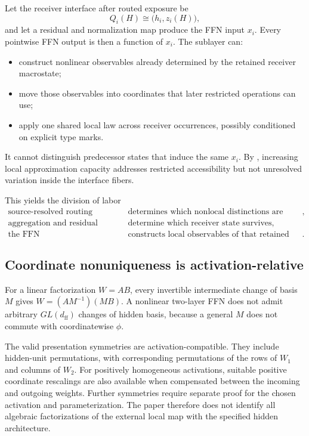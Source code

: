 Let the receiver interface after routed exposure be
\[
Q_i(H)\cong\bigl(h_i,z_i(H)\bigr),
\]
and let a residual and normalization map produce the FFN input $x_i$. Every pointwise FFN output is then a function of $x_i$. The sublayer can:
\begin{itemize}
\item construct nonlinear observables already determined by the retained receiver macrostate;
\item move those observables into coordinates that later restricted operations can use;
\item apply one shared local law across receiver occurrences, possibly conditioned on explicit type marks.
\end{itemize}
It cannot distinguish predecessor states that induce the same $x_i$. By , increasing local approximation capacity addresses restricted accessibility but not unresolved variation inside the interface fibers.

This yields the division of labor
\[
\boxed{
\begin{aligned}
\text{source-resolved routing}
&\text{ determines which nonlocal distinctions are constructed},\\
\text{aggregation and residual retention}
&\text{ determine which receiver state survives},\\
\text{the FFN}
&\text{ constructs local observables of that retained state}.
\end{aligned}}
\]

\subsection{Coordinate nonuniqueness is activation-relative}

For a linear factorization $W=AB$, every invertible intermediate change of basis $M$ gives $W=(AM^{-1})(MB)$. A nonlinear two-layer FFN does not admit arbitrary $GL(d_{\mathrm{ff}})$ changes of hidden basis, because a general $M$ does not commute with coordinatewise $\phi$.

The valid presentation symmetries are activation-compatible. They include hidden-unit permutations, with corresponding permutations of the rows of $W_1$ and columns of $W_2$. For positively homogeneous activations, suitable positive coordinate rescalings are also available when compensated between the incoming and outgoing weights. Further symmetries require separate proof for the chosen activation and parameterization. The paper therefore does not identify all algebraic factorizations of the external local map with the specified hidden architecture.

